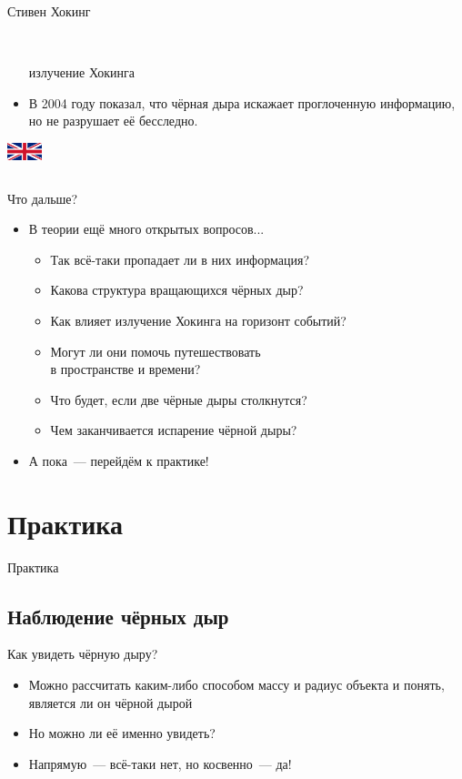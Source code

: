 \documentclass[usenames,dvipsnames,pdftex,unicode,hidelinks]{beamer}
\newcommand{\splashsection}[1]{
    \section{#1}
    \begin{frame}[plain]
      \begin{center}
        \huge #1
      \end{center}
    \end{frame}
  }
\begin{document}
\begin{frame}{Стивен Хокинг}
\begin{columns}[t]
\begin{column}{0.75\textwidth}
\begin{itemize}
            \\ \alert{излучение Хокинга}
          \item В 2004 году показал, что чёрная дыра искажает
            проглоченную информацию, но не разрушает её бесследно.
        \end{itemize}
        \begin{center}
          \includegraphics[width=1cm]{britain}
        \end{center}
      \end{column}
    \end{columns}
  \end{frame}

  \begin{frame}{Что дальше?}
    \begin{itemize}
      \item В теории ещё много открытых вопросов...
        \begin{itemize}
          \item Так всё-таки пропадает ли в них информация?
          \item Какова структура вращающихся чёрных дыр?
          \item Как влияет излучение Хокинга на горизонт событий?
          \item Могут ли они помочь путешествовать\\ в пространстве и времени?
          \item Что будет, если две чёрные дыры столкнутся?
          \item Чем заканчивается испарение чёрной дыры?
        \end{itemize}
      \item А пока~--- перейдём к практике!
    \end{itemize}
  \end{frame}

  \splashsection{Практика}

  \subsection{Наблюдение чёрных дыр}

  \begin{frame}{Как увидеть чёрную дыру?}
    \begin{itemize}
      \item<1-> Можно рассчитать каким-либо способом массу и радиус объекта и понять, является ли он
        чёрной дырой
        \vspace{3mm}
      \item<1-> Но можно ли её именно \alert{увидеть}?
        \vspace{3mm}
      \item<2-> Напрямую~--- всё-таки нет, но косвенно~--- да!
    \end{itemize}
  \end{frame}
\end{document}

